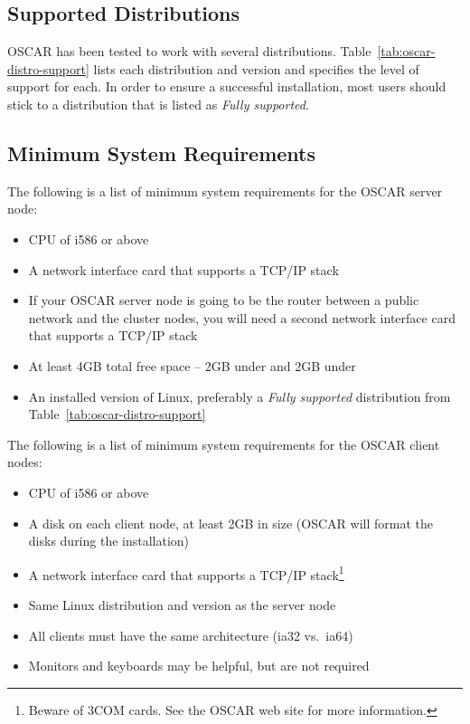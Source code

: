\subsection{Supported Distributions}

OSCAR has been tested to work with several distributions.
Table~\ref{tab:oscar-distro-support} lists each distribution and
version and specifies the level of support for each. In order to
ensure a successful installation, most users should stick to a
distribution that is listed as \emph{Fully supported}.




\subsection{Minimum System Requirements}
\label{sec:intro-min-sys}

\begchange

The following is a list of minimum system requirements for the OSCAR
server node:

\begin{itemize}
\item CPU of i586 or above
\item A network interface card that supports a TCP/IP stack
\item If your OSCAR server node is going to be the router between a
  public network and the cluster nodes, you will need a second
  network interface card that supports a TCP/IP stack
\item At least 4GB total free space -- 2GB under \file{/} and 2GB
  under 
\item An installed version of Linux, preferably a {\em Fully
    supported} distribution from Table~\ref{tab:oscar-distro-support}
\end{itemize}

The following is a list of minimum system requirements for the OSCAR
client nodes:

\begin{itemize}
\item CPU of i586 or above
\item A disk on each client node, at least 2GB in size (OSCAR will
  format the disks during the installation)
\item A network interface card that supports a TCP/IP
  stack\footnote{Beware of 3COM cards.  See the OSCAR web site for
  more information.}
\item Same Linux distribution and version as the server node
\item All clients must have the same architecture (ia32 vs.\ ia64)
\item Monitors and keyboards may be helpful, but are not required
\end{itemize}

